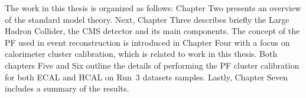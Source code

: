 The work in this thesis is organized as follows:
Chapter Two presents an overview of the standard model theory.
Next, Chapter Three describes briefly the Large Hadron Collider, the CMS detector and its main components.
The concept of the PF used in event reconstruction is introduced in Chapter Four with a focus on calorimeter cluster calibration, which is related to work in this thesis.
Both chapters Five and Six outline the details of performing the PF cluster calibration for both ECAL and HCAL on Run~3 datasets samples.
Lastly, Chapter Seven includes a summary of the results.
